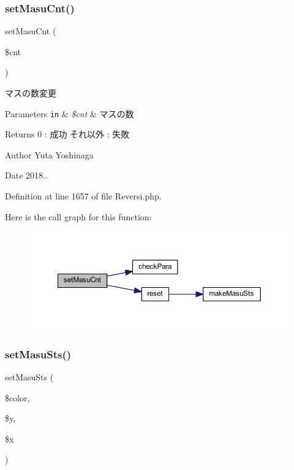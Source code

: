 \subsubsection{\texorpdfstring{set\+Masu\+Cnt()}{setMasuCnt()}}
{\footnotesize\ttfamily set\+Masu\+Cnt (\begin{DoxyParamCaption}\item[{}]{\$cnt }\end{DoxyParamCaption})}



マスの数変更 


\begin{DoxyParams}[1]{Parameters}
\mbox{\tt in}  & {\em \$cnt} & マスの数 \\
\hline
\end{DoxyParams}
\begin{DoxyReturn}{Returns}
0 \+: 成功 それ以外 \+: 失敗 
\end{DoxyReturn}
\begin{DoxyAuthor}{Author}
Yuta Yoshinaga 
\end{DoxyAuthor}
\begin{DoxyDate}{Date}
2018.. 
\end{DoxyDate}


Definition at line 1657 of file Reversi.\+php.

Here is the call graph for this function\+:\nopagebreak
\begin{figure}[H]
\begin{center}
\leavevmode
\includegraphics[width=350pt]{class_reversi_ab6853cc0f53e50a70d576f15296f0864_cgraph}
\end{center}
\end{figure}
\mbox{\label{class_reversi_a26f3168c7d94e70d344841d65885a4ac}} 
\subsubsection{\texorpdfstring{set\+Masu\+Sts()}{setMasuSts()}}
{\footnotesize\ttfamily set\+Masu\+Sts (\begin{DoxyParamCaption}\item[{}]{\$color,  }\item[{}]{\$y,  }\item[{}]{\$x }\end{DoxyParamCaption})}



